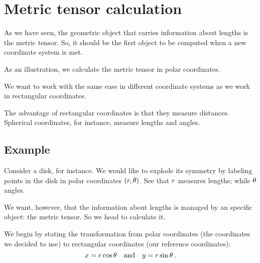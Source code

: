 \section{Metric tensor calculation}
%
As we have seen, the geometric object that carries information about lengths is the metric tensor. So, it should be the first object to be computed when a new coordinate system is met.

As an illustration, we calculate the metric tensor in polar coordinates.

 We want to work with the same ease in different coordinate systems as we work in rectangular coordinates.

 The advantage of rectangular coordinates is that they measure distances. Spherical coordinates, for instance, measure lengths and angles.


\subsection{Example}
%
Consider a disk, for instance. We would like to explode its symmetry by labeling points in the disk in polar coordinates $\tuple{\cxpos,\cypos}$. See that $r$ measures lengths; while $\theta$ angles.

 We want, however, that the information about lengths is managed by an specific object: the metric tensor. So we head to calculate it.

 We begin by stating the transformation from polar coordinates (the coordinates we decided to use) to rectangular coordinates (our reference coordinates):
%
\begin{equation*}
  x = r\cos\theta\quad\text{and}\quad
  y = r\sin\theta\,.
\end{equation*}

